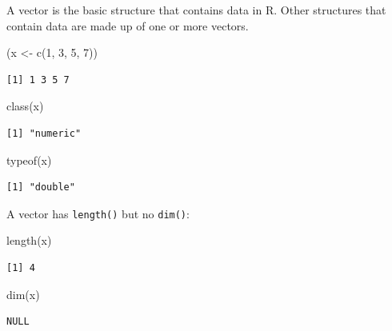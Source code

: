\documentclass[
]{book}
\newenvironment{Shaded}{\begin{snugshade}}{\end{snugshade}}
\newcommand{\DecValTok}[1]{\textcolor[rgb]{0.00,0.00,0.81}{#1}}
\newcommand{\FunctionTok}[1]{\textcolor[rgb]{0.00,0.00,0.00}{#1}}
\newcommand{\NormalTok}[1]{#1}
\newcommand{\OtherTok}[1]{\textcolor[rgb]{0.56,0.35,0.01}{#1}}
\begin{document}
A vector is the basic structure that contains data in R. Other structures that contain data are made up of one or more vectors.

\begin{Shaded}
\begin{Highlighting}[]
\NormalTok{(x }\OtherTok{\textless{}{-}} \FunctionTok{c}\NormalTok{(}\DecValTok{1}\NormalTok{, }\DecValTok{3}\NormalTok{, }\DecValTok{5}\NormalTok{, }\DecValTok{7}\NormalTok{))}
\end{Highlighting}
\end{Shaded}

\begin{verbatim}
[1] 1 3 5 7
\end{verbatim}

\begin{Shaded}
\begin{Highlighting}[]
\FunctionTok{class}\NormalTok{(x)}
\end{Highlighting}
\end{Shaded}

\begin{verbatim}
[1] "numeric"
\end{verbatim}

\begin{Shaded}
\begin{Highlighting}[]
\FunctionTok{typeof}\NormalTok{(x)}
\end{Highlighting}
\end{Shaded}

\begin{verbatim}
[1] "double"
\end{verbatim}

A vector has \texttt{length()} but no \texttt{dim()}:

\begin{Shaded}
\begin{Highlighting}[]
\FunctionTok{length}\NormalTok{(x)}
\end{Highlighting}
\end{Shaded}

\begin{verbatim}
[1] 4
\end{verbatim}

\begin{Shaded}
\begin{Highlighting}[]
\FunctionTok{dim}\NormalTok{(x)}
\end{Highlighting}
\end{Shaded}

\begin{verbatim}
NULL
\end{verbatim}
\end{document}
